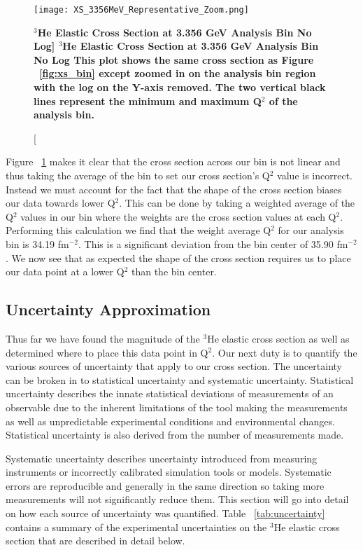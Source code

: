 \begin{figure}[!ht]
\begin{center}
\texttt{[image: XS\_3356MeV\_Representative\_Zoom.png]}
\end{center}
\caption[\bf{$^3$He Elastic Cross Section at 3.356 GeV Analysis Bin No Log}]{
{\bf{$^3$He Elastic Cross Section at 3.356 GeV Analysis Bin No Log}} This plot shows the same cross section as Figure ~\ref{fig:xs_bin} except zoomed in on the analysis bin region with the log on the Y-axis removed. The two vertical black lines represent the minimum and maximum Q$^2$ of the analysis bin.}
\label{fig:xs_bin_zoom}
\end{figure}

Figure ~\ref{fig:xs_bin_zoom} makes it clear that the cross section across our bin is not linear and thus taking the average of the bin to set our cross section's Q$^2$ value is incorrect. Instead we must account for the fact that the shape of the cross section biases our data towards lower Q$^2$. This can be done by taking a weighted average of the Q$^2$ values in our bin where the weights are the cross section values at each Q$^2$. Performing this calculation we find that the weight average Q$^2$ for our analysis bin is 34.19 fm$^{-2}$. This is a significant deviation from the bin center of 35.90 fm$^{-2}$. We now see that as expected the shape of the cross section requires us to place our data point at a lower Q$^2$ than the bin center.

\subsection{Uncertainty Approximation}
\label{ssec:uncertainty}

Thus far we have found the magnitude of the $^3$He elastic cross section as well as determined where to place this data point in Q$^2$. Our next duty is to quantify the various sources of uncertainty that apply to our cross section. The uncertainty can be broken in to statistical uncertainty and systematic uncertainty. Statistical uncertainty describes the innate statistical deviations of measurements of an observable due to the inherent limitations of the tool making the measurements as well as unpredictable experimental conditions and environmental changes. Statistical uncertainty is also derived from the number of measurements made. 

Systematic uncertainty describes uncertainty introduced from measuring instruments or incorrectly calibrated simulation tools or models. Systematic errors are reproducible and generally in the same direction so taking more measurements will not significantly reduce them. This section will go into detail on how each source of uncertainty was quantified. Table ~\ref{tab:uncertainty} contains a summary of the experimental uncertainties on the $^3$He elastic cross section that are described in detail below.

